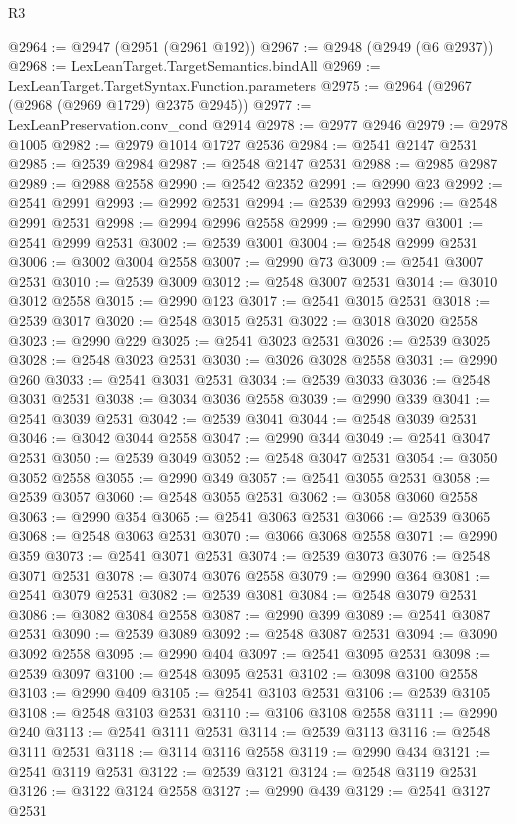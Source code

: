 \begin{lexlean}{R3}
\begin{coremodule}
@2964 := @2947 (@2951 (@2961 @192))
@2967 := @2948 (@2949 (@6 @2937))
@2968 := LexLeanTarget.TargetSemantics.bindAll
@2969 := LexLeanTarget.TargetSyntax.Function.parameters
@2975 := @2964 (@2967 (@2968 (@2969 @1729) @2375 @2945))
@2977 := LexLeanPreservation.conv_cond @2914
@2978 := @2977 @2946
@2979 := @2978 @1005
@2982 := @2979 @1014 @1727 @2536
@2984 := @2541 @2147 @2531
@2985 := @2539 @2984
@2987 := @2548 @2147 @2531
@2988 := @2985 @2987
@2989 := @2988 @2558
@2990 := @2542 @2352
@2991 := @2990 @23
@2992 := @2541 @2991
@2993 := @2992 @2531
@2994 := @2539 @2993
@2996 := @2548 @2991 @2531
@2998 := @2994 @2996 @2558
@2999 := @2990 @37
@3001 := @2541 @2999 @2531
@3002 := @2539 @3001
@3004 := @2548 @2999 @2531
@3006 := @3002 @3004 @2558
@3007 := @2990 @73
@3009 := @2541 @3007 @2531
@3010 := @2539 @3009
@3012 := @2548 @3007 @2531
@3014 := @3010 @3012 @2558
@3015 := @2990 @123
@3017 := @2541 @3015 @2531
@3018 := @2539 @3017
@3020 := @2548 @3015 @2531
@3022 := @3018 @3020 @2558
@3023 := @2990 @229
@3025 := @2541 @3023 @2531
@3026 := @2539 @3025
@3028 := @2548 @3023 @2531
@3030 := @3026 @3028 @2558
@3031 := @2990 @260
@3033 := @2541 @3031 @2531
@3034 := @2539 @3033
@3036 := @2548 @3031 @2531
@3038 := @3034 @3036 @2558
@3039 := @2990 @339
@3041 := @2541 @3039 @2531
@3042 := @2539 @3041
@3044 := @2548 @3039 @2531
@3046 := @3042 @3044 @2558
@3047 := @2990 @344
@3049 := @2541 @3047 @2531
@3050 := @2539 @3049
@3052 := @2548 @3047 @2531
@3054 := @3050 @3052 @2558
@3055 := @2990 @349
@3057 := @2541 @3055 @2531
@3058 := @2539 @3057
@3060 := @2548 @3055 @2531
@3062 := @3058 @3060 @2558
@3063 := @2990 @354
@3065 := @2541 @3063 @2531
@3066 := @2539 @3065
@3068 := @2548 @3063 @2531
@3070 := @3066 @3068 @2558
@3071 := @2990 @359
@3073 := @2541 @3071 @2531
@3074 := @2539 @3073
@3076 := @2548 @3071 @2531
@3078 := @3074 @3076 @2558
@3079 := @2990 @364
@3081 := @2541 @3079 @2531
@3082 := @2539 @3081
@3084 := @2548 @3079 @2531
@3086 := @3082 @3084 @2558
@3087 := @2990 @399
@3089 := @2541 @3087 @2531
@3090 := @2539 @3089
@3092 := @2548 @3087 @2531
@3094 := @3090 @3092 @2558
@3095 := @2990 @404
@3097 := @2541 @3095 @2531
@3098 := @2539 @3097
@3100 := @2548 @3095 @2531
@3102 := @3098 @3100 @2558
@3103 := @2990 @409
@3105 := @2541 @3103 @2531
@3106 := @2539 @3105
@3108 := @2548 @3103 @2531
@3110 := @3106 @3108 @2558
@3111 := @2990 @240
@3113 := @2541 @3111 @2531
@3114 := @2539 @3113
@3116 := @2548 @3111 @2531
@3118 := @3114 @3116 @2558
@3119 := @2990 @434
@3121 := @2541 @3119 @2531
@3122 := @2539 @3121
@3124 := @2548 @3119 @2531
@3126 := @3122 @3124 @2558
@3127 := @2990 @439
@3129 := @2541 @3127 @2531

\end{coremodule}
\end{lexlean}
